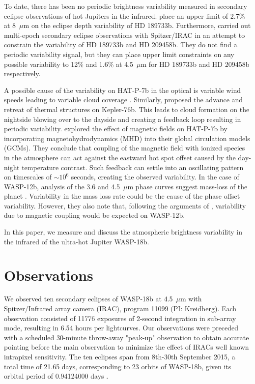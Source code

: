 To date, there has been no periodic brightness variability measured in secondary eclipse observations of hot Jupiters in the infrared. \citet{Agol2010} place an upper limit of 2.7\% at 8~$\mu$m on the eclipse depth variability of HD 189733b. Furthermore, \citet{Kilpatrick2020} carried out multi-epoch secondary eclipse observations with Spitzer/IRAC in an attempt to constrain the variability of HD 189733b and HD 209458b. They do not find a periodic variability signal, but they can place upper limit constraints on any possible variability to 12\% and 1.6\% at 4.5~$\mu$m for HD 189733b and HD 209458b respectively.

A possible cause of the variability on HAT-P-7b in the optical is variable wind speeds leading to variable cloud coverage \citep{Armstrong2016}. Similarly, \citet{Jackson2019} proposed the advance and retreat of thermal structures on Kepler-76b. This leads to cloud formation on the nightside blowing over to the dayside and creating a feedback loop resulting in periodic variability. \citet{Rogers2017} explored the effect of magnetic fields on HAT-P-7b by incorporating magnetohydrodynamics (MHD) into their global circulation models (GCMs). They conclude that coupling of the magnetic field with ionized species in the atmosphere can act against the eastward hot spot offset caused by the day-night temperature contrast. Such feedback can settle into an oscillating pattern on timescales of $\sim10^6$ seconds, creating the observed variability. In the case of WASP-12b, analysis of the 3.6 and 4.5~$\mu$m phase curves suggest mass-loss of the planet \citep{Bell2019}. Variability in the mass loss rate could be the cause of the phase offset variability. However, they also note that, following the arguments of \citet{Rogers2017}, variability due to magnetic coupling would be expected on WASP-12b.

In this paper, we measure and discuss the atmospheric brightness variability in the infrared of the ultra-hot Jupiter WASP-18b.

\section{Observations}

We observed ten secondary eclipses of WASP-18b at 4.5~$\mu$m with Spitzer/Infrared array camera (IRAC), program 11099 (PI: Kreidberg). Each observation consisted of 11776 exposures of 2-second integration in sub-array mode, resulting in 6.54 hours per lightcurves. Our observations were preceded with a scheduled 30-minute throw-away "peak-up" observation to obtain accurate pointing before the main observation to minimize the effect of IRACs well known intrapixel sensitivity. The ten eclipses span from 8th-30th September 2015, a total time of 21.65 days, corresponding to 23 orbits of WASP-18b, given its orbital period of 0.94124000 days \citep{Pearson2019}.

